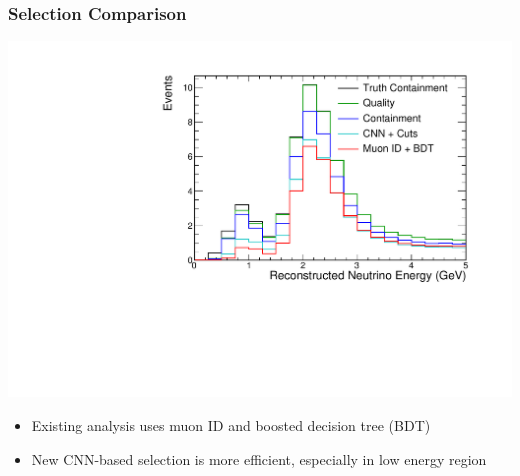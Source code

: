 \documentclass[10pt,professionalfonts,xcolor=table]{beamer}
\begin{document}
\begin{frame}
\frametitle{Selection Comparison}
  \begin{center}
   \includegraphics[height=0.7\textwidth, angle=-90]{figures/selection/cosmic_sig_osc.pdf}
  \end{center}
  \gap
  \begin{itemize}
  \item Existing \nova analysis uses muon ID and boosted decision tree (BDT)
  \gap
  \item New CNN-based selection is more efficient, especially in low energy region
  \end{itemize}
\end{frame}
\end{document}
